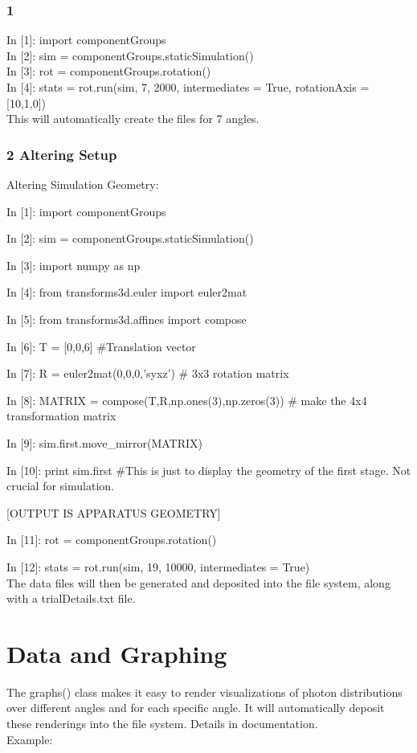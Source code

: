 \documentclass[11pt, oneside]{ltxdoc}   	%
\begin{document}
\subsubsection{1}
In [1]: import componentGroups\\
In [2]: sim = componentGroups.staticSimulation()\\
In [3]: rot = componentGroups.rotation()\\
In [4]: stats = rot.run(sim, 7, 2000, intermediates = True, rotationAxis = [10,1,0])\\

This will automatically create the files for 7 angles.
\subsubsection{2 Altering Setup}

Altering Simulation Geometry:

In [1]: import componentGroups

In [2]: sim = componentGroups.staticSimulation()

In [3]: import numpy as np

In [4]: from transforms3d.euler import euler2mat

In [5]: from transforms3d.affines import compose

In [6]: T = [0,0,6] \#Translation vector

In [7]: R = euler2mat(0,0,0,'syxz') \# 3x3 rotation matrix 

In [8]: MATRIX = compose(T,R,np.ones(3),np.zeros(3)) \# make the 4x4 transformation matrix

In [9]: sim.first.move\_mirror(MATRIX)

In [10]: print sim.first    \#This is just to display the geometry of the first stage. Not crucial for simulation.

[OUTPUT IS APPARATUS GEOMETRY]

In [11]: rot = componentGroups.rotation()

In [12]: stats = rot.run(sim, 19, 10000, intermediates = True)\\

The data files will then be generated and deposited into the file system, along with a trialDetails.txt file.

\section{Data and Graphing}
The graphs() class makes it easy to render visualizations of photon distributions over different angles and for each specific angle. It will automatically deposit these renderings into the file system. Details in documentation.\\
Example:
\end{document}

